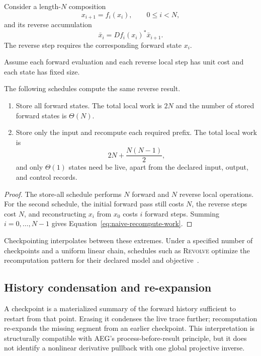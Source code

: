 Consider a length-$N$ composition
\[
  x_{i+1}=f_i(x_i),
  \qquad 0\le i<N,
\]
and its reverse accumulation
\[
  \bar x_i=Df_i(x_i)^*\bar x_{i+1}.
\]
The reverse step requires the corresponding forward state $x_i$.

Assume each forward evaluation and each reverse local step has unit cost and
each state has fixed size.

\begin{proposition}
\label{prop:reverse-chain-extremes}
The following schedules compute the same reverse result.
\begin{enumerate}
  \item Store all forward states.  The total local work is $2N$ and the number
  of stored forward states is $\Theta(N)$.
  \item Store only the input and recompute each required prefix.  The total
  local work is
  \begin{equation}
    2N+\frac{N(N-1)}2,
    \label{eq:naive-recompute-work}
  \end{equation}
  and only $\Theta(1)$ states need be live, apart from the declared input,
  output, and control records.
\end{enumerate}
\end{proposition}

\begin{proof}
The store-all schedule performs $N$ forward and $N$ reverse local operations.
For the second schedule, the initial forward pass still costs $N$, the reverse
steps cost $N$, and reconstructing $x_i$ from $x_0$ costs $i$ forward steps.
Summing $i=0,\ldots,N-1$ gives Equation~\eqref{eq:naive-recompute-work}.
\end{proof}

Checkpointing interpolates between these extremes.  Under a specified number
of checkpoints and a uniform linear chain, schedules such as
\textsc{Revolve} optimize the recomputation pattern for their declared model
and objective~\cite{GriewankWalther2000}.

\subsection{History condensation and re-expansion}

A checkpoint is a materialized summary of the forward history sufficient to
restart from that point.  Erasing it condenses the live trace further;
recomputation re-expands the missing segment from an earlier checkpoint.  This
interpretation is structurally compatible with AEG's process-before-result
principle, but it does not identify a nonlinear derivative pullback with one
global projective inverse.

